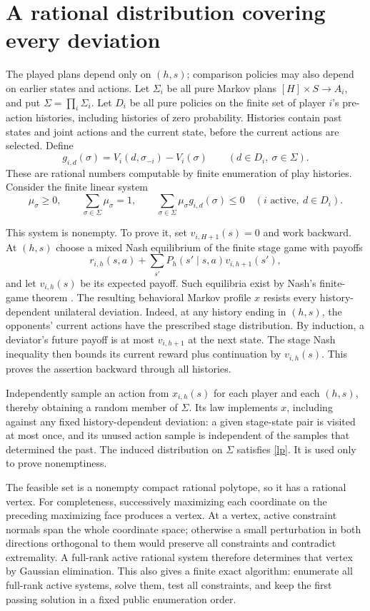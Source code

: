 \documentclass[11pt]{article}
\begin{document}
\section{A rational distribution covering every deviation}
The played plans depend only on $(h,s)$; comparison policies may also
depend on earlier states and actions.
Let $\Sigma_i$ be all pure Markov plans $[H]\times S\to A_i$, and put
$\Sigma=\prod_i\Sigma_i$. Let $D_i$ be all pure policies on the finite
set of player $i$'s pre-action histories, including histories of zero
probability. Histories contain past states and joint actions and the
current state, before the current actions are selected. Define
\[
 g_{i,d}(\sigma)=V_i(d,\sigma_{-i})-V_i(\sigma)
 \qquad(d\in D_i,\ \sigma\in\Sigma).
\]
These are rational numbers computable by finite enumeration of play
histories. Consider the finite linear system
\begin{equation}\label{lp}
 \mu_\sigma\geq0,\qquad \sum_{\sigma\in\Sigma}\mu_\sigma=1,
 \qquad \sum_{\sigma\in\Sigma}\mu_\sigma g_{i,d}(\sigma)\leq0
 \quad(i\text{ active},\ d\in D_i).
\end{equation}

This system is nonempty. To prove it, set $v_{i,H+1}(s)=0$ and work
backward. At $(h,s)$ choose a mixed Nash equilibrium of the finite
stage game with payoffs
\[
 r_{i,h}(s,a)+\sum_{s'}P_h(s'\mid s,a)v_{i,h+1}(s'),
\]
and let $v_{i,h}(s)$ be its expected payoff. Such equilibria exist by
Nash's finite-game theorem \cite{nash}. The resulting behavioral Markov
profile $x$ resists every history-dependent unilateral deviation.
Indeed, at any history ending in $(h,s)$, the opponents' current actions
have the prescribed stage distribution. By induction, a deviator's
future payoff is at most $v_{i,h+1}$ at the next state. The stage Nash
inequality then bounds its current reward plus continuation by
$v_{i,h}(s)$. This proves the assertion backward through all histories.

Independently sample an action from $x_{i,h}(s)$ for each player and
each $(h,s)$, thereby obtaining a random member of $\Sigma$.
Its law implements $x$, including against any fixed history-dependent
deviation: a given stage-state pair is visited at most once, and its
unused action sample is independent of the samples that determined
the past. The induced distribution on $\Sigma$ satisfies
\eqref{lp}. It is used only to prove nonemptiness.

The feasible set is a nonempty compact rational polytope, so it has a
rational vertex. For completeness, successively maximizing each
coordinate on the preceding maximizing face produces a vertex.
At a vertex, active constraint normals span the whole coordinate space;
otherwise a small perturbation in both directions orthogonal to them
would preserve all constraints and contradict extremality. A full-rank
active rational system therefore determines that vertex by Gaussian
elimination. This also gives a finite exact algorithm: enumerate all
full-rank active systems, solve them, test all constraints, and keep the
first passing solution in a fixed public enumeration order.
\end{document}

